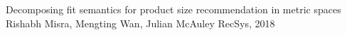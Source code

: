 \documentclass[letterpaper, 10 pt, conference]{ieeeconf}  %
\begin{document}
\addtolength{\textheight}{-12cm}   %









\begin{thebibliography}{99}

 Decomposing fit semantics for product size recommendation in metric spaces
Rishabh Misra, Mengting Wan, Julian McAuley
RecSys, 2018

\end{thebibliography}
\end{document}
